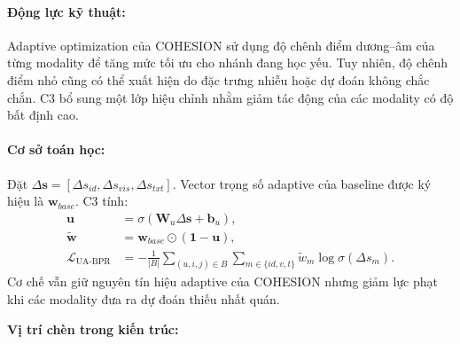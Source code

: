 \paragraph{Động lực kỹ thuật:}
Adaptive optimization của COHESION sử dụng độ chênh điểm dương--âm của từng modality để tăng mức tối ưu cho nhánh đang học yếu. Tuy nhiên, độ chênh điểm nhỏ cũng có thể xuất hiện do đặc trưng nhiễu hoặc dự đoán không chắc chắn. C3 bổ sung một lớp hiệu chỉnh nhằm giảm tác động của các modality có độ bất định cao.

\paragraph{Cơ sở toán học:}
Đặt $\Delta\mathbf s=[\Delta s_{id},\Delta s_{vis},\Delta s_{txt}]$. Vector trọng số adaptive của baseline được ký hiệu là $\mathbf w_{base}$. C3 tính:
\begin{align}
\mathbf u&=\sigma\!\left(\mathbf W_u\Delta\mathbf s+\mathbf b_u\right),\\
\widetilde{\mathbf w}&=\mathbf w_{base}\odot(\mathbf 1-\mathbf u),\\
\mathcal L_{\text{UA-BPR}}&=-\frac{1}{|B|}
\sum_{(u,i,j)\in B}\sum_{m\in\{id,v,t\}}
\widetilde w_m\log\sigma(\Delta s_m).
\end{align}
Cơ chế vẫn giữ nguyên tín hiệu adaptive của COHESION nhưng giảm lực phạt khi các modality đưa ra dự đoán thiếu nhất quán.

\par\medskip
\noindent\textbf{Vị trí chèn trong kiến trúc:}\par
\nopagebreak[4]

